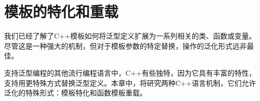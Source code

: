 \chapter{模板的特化和重载}
我们已经了解了C++模板如何将泛型定义扩展为一系列相关的类、函数或变量。尽管这是一种强大的机制，但对于模板参数的特定替换，操作的泛化形式远非最佳。

支持泛型编程的其他流行编程语言中，C++有些独特，因为它具有丰富的特性，支持用更特殊方式替换泛型定义。本章中，将研究两种C++语言机制，它们允许泛化的特殊形式：模板特化和函数模板重载。





